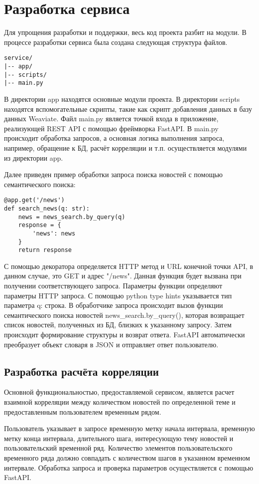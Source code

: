 \section{Разработка сервиса}

Для упрощения разработки и поддержки, весь код проекта разбит на модули. В процессе разработки сервиса была создана следующая структура файлов.
\begin{lstlisting}
service/
|-- app/
|-- scripts/
|-- main.py
\end{lstlisting}

В директории app находятся основные модули проекта. В директории scripts находятся вспомогательные скрипты, такие как скрипт добавления данных в базу данных Weaviate. Файл main.py является точкой входа в приложение, реализующей REST API с помощью фреймворка FastAPI. В main.py происходит обработка запросов, а основная логика выполнения запроса, например, обращение к БД, расчёт корреляции и т.п. осуществляется модулями из директории app.

Далее приведен пример обработки запроса поиска новостей с помощью семантического поиска:
\begin{lstlisting}
@app.get('/news')
def search_news(q: str):
    news = news_search.by_query(q)
    response = {
        'news': news
    }
    return response
\end{lstlisting}

С помощью декоратора определяется HTTP метод и URL конечной точки API, в данном случае, это GET и адрес "/news". Данная функция будет вызвана при получении соответствующего запроса. Параметры функции определяют параметры HTTP запроса. С помощью python type hints указывается тип параметра q: строка. В обработчике запроса происходит вызов функции семантического поиска новостей news\_search.by\_query(), которая возвращает список новостей, полученных из БД, близких к указанному запросу. Затем происходит формирование структуры и возврат ответа. FastAPI автоматически преобразует объект словаря в JSON и отправляет ответ пользователю.

\subsection{Разработка расчёта корреляции}

Основной функциональностью, предоставляемой сервисом, является расчет взаимной корреляции между количеством новостей по определенной теме и предоставленным пользователем временным рядом.

Пользователь указывает в запросе временную метку начала интервала, временную метку конца интервала, длительного шага, интересующую тему новостей и пользовательский временной ряд. Количество элементов пользовательского временного ряда должно совпадать с количеством шагов в указанном временном интервале. Обработка запроса и проверка параметров осуществляется с помощью FastAPI.

